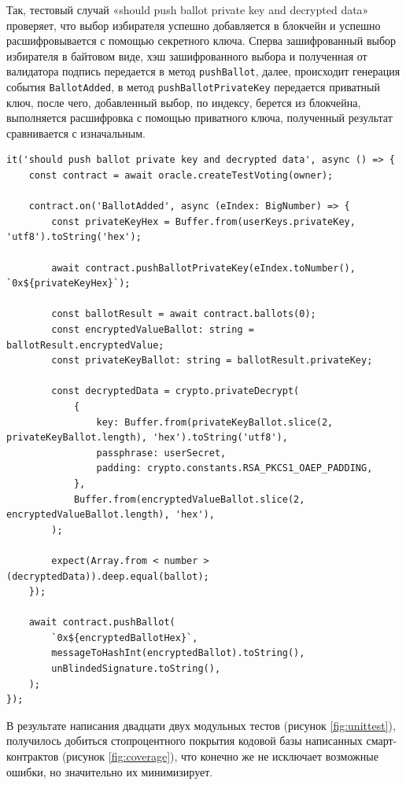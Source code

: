Так, тестовый случай «should push ballot private key and decrypted data» проверяет, что выбор избирателя успешно добавляется в блокчейн и успешно расшифровывается с помощью секретного ключа. Сперва зашифрованный выбор избирателя в байтовом виде, хэш зашифрованного выбора и полученная от валидатора подпись передается в метод \verb|pushBallot|, далее, происходит генерация события \verb|BallotAdded|, в метод \verb|pushBallotPrivateKey| передается приватный ключ, после чего, добавленный выбор, по индексу, берется из блокчейна, выполняется расшифровка с помощью приватного ключа, полученный результат сравнивается с изначальным.

\begin{lstlisting}[caption={Тестовый случай «should push ballot private key and decrypted data»}, label={ls:oracle}]
it('should push ballot private key and decrypted data', async () => {
    const contract = await oracle.createTestVoting(owner);

    contract.on('BallotAdded', async (eIndex: BigNumber) => {
        const privateKeyHex = Buffer.from(userKeys.privateKey, 'utf8').toString('hex');

        await contract.pushBallotPrivateKey(eIndex.toNumber(), `0x${privateKeyHex}`);

        const ballotResult = await contract.ballots(0);
        const encryptedValueBallot: string = ballotResult.encryptedValue;
        const privateKeyBallot: string = ballotResult.privateKey;

        const decryptedData = crypto.privateDecrypt(
            {
                key: Buffer.from(privateKeyBallot.slice(2, privateKeyBallot.length), 'hex').toString('utf8'),
                passphrase: userSecret,
                padding: crypto.constants.RSA_PKCS1_OAEP_PADDING,
            },
            Buffer.from(encryptedValueBallot.slice(2, encryptedValueBallot.length), 'hex'),
        );

        expect(Array.from < number > (decryptedData)).deep.equal(ballot);
    });

    await contract.pushBallot(
        `0x${encryptedBallotHex}`,
        messageToHashInt(encryptedBallot).toString(),
        unBlindedSignature.toString(),
    );
});
\end{lstlisting}

В результате написания двадцати двух модульных тестов (рисунок \ref{fig:unittest}), получилось добиться стопроцентного покрытия кодовой базы написанных смарт-контрактов (рисунок \ref{fig:coverage}), что конечно же не исключает возможные ошибки, но значительно их минимизирует.

